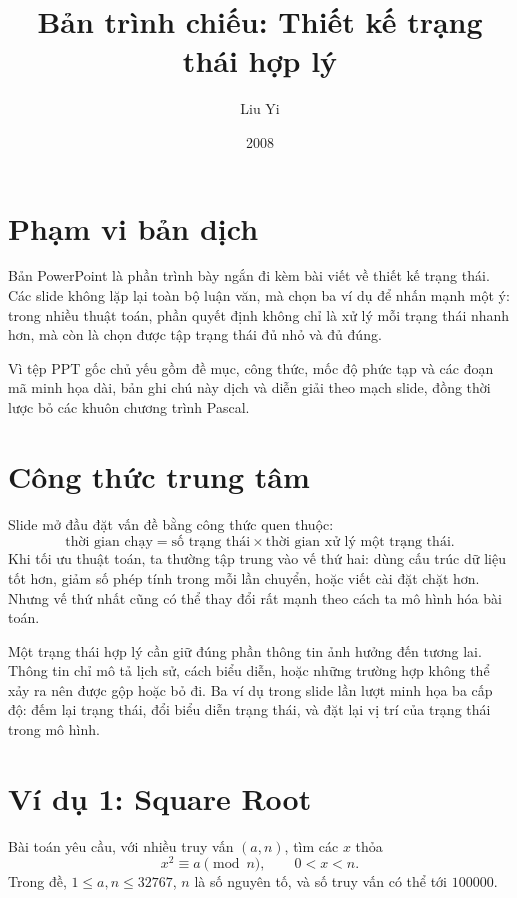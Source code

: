 \documentclass[11pt]{article}
\title{Bản trình chiếu: Thiết kế trạng thái hợp lý}
\author{Liu Yi}
\date{2008}
\begin{document}
\maketitle


\section{Phạm vi bản dịch}

Bản PowerPoint là phần trình bày ngắn đi kèm bài viết về thiết kế trạng thái.
Các slide không lặp lại toàn bộ luận văn, mà chọn ba ví dụ để nhấn mạnh một
ý: trong nhiều thuật toán, phần quyết định không chỉ là xử lý mỗi trạng thái
nhanh hơn, mà còn là chọn được tập trạng thái đủ nhỏ và đủ đúng.

Vì tệp PPT gốc chủ yếu gồm đề mục, công thức, mốc độ phức tạp và các đoạn mã
minh họa dài, bản ghi chú này dịch và diễn giải theo mạch slide, đồng thời
lược bỏ các khuôn chương trình Pascal.

\section{Công thức trung tâm}

Slide mở đầu đặt vấn đề bằng công thức quen thuộc:
\[
  \text{thời gian chạy}
  =
  \text{số trạng thái}
  \times
  \text{thời gian xử lý một trạng thái}.
\]
Khi tối ưu thuật toán, ta thường tập trung vào vế thứ hai: dùng cấu trúc dữ
liệu tốt hơn, giảm số phép tính trong mỗi lần chuyển, hoặc viết cài đặt chặt
hơn. Nhưng vế thứ nhất cũng có thể thay đổi rất mạnh theo cách ta mô hình hóa
bài toán.

Một trạng thái hợp lý cần giữ đúng phần thông tin ảnh hưởng đến tương lai.
Thông tin chỉ mô tả lịch sử, cách biểu diễn, hoặc những trường hợp không thể
xảy ra nên được gộp hoặc bỏ đi. Ba ví dụ trong slide lần lượt minh họa ba
cấp độ: đếm lại trạng thái, đổi biểu diễn trạng thái, và đặt lại vị trí của
trạng thái trong mô hình.

\section{Ví dụ 1: Square Root}

Bài toán yêu cầu, với nhiều truy vấn \((a,n)\), tìm các \(x\) thỏa
\[
  x^2 \equiv a \pmod n,\qquad 0 < x < n.
\]
Trong đề, \(1\le a,n\le 32767\), \(n\) là số nguyên tố, và số truy vấn có thể
tới \(100000\).
\end{document}
